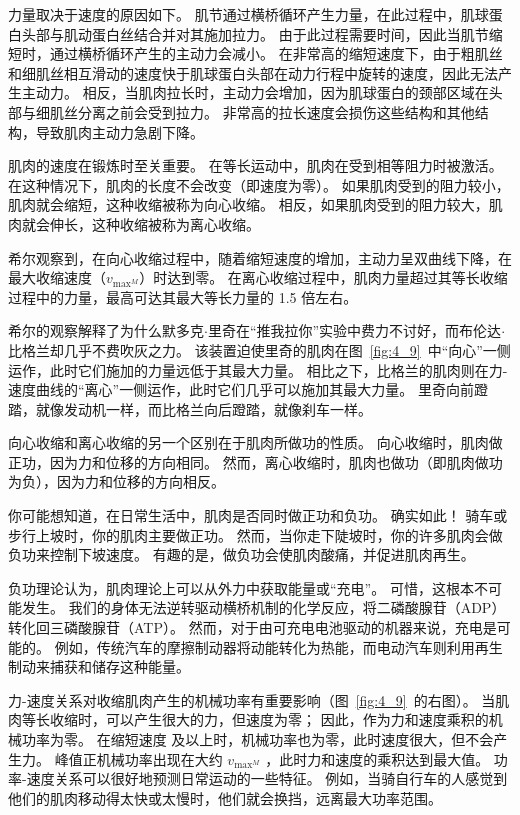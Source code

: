 力量取决于速度的原因如下。
肌节通过横桥循环产生力量，在此过程中，肌球蛋白头部与肌动蛋白丝结合并对其施加拉力。
由于此过程需要时间，因此当肌节缩短时，通过横桥循环产生的主动力会减小。
在非常高的缩短速度下，由于粗肌丝和细肌丝相互滑动的速度快于肌球蛋白头部在动力行程中旋转的速度，因此无法产生主动力。
相反，当肌肉拉长时，主动力会增加，因为肌球蛋白的颈部区域在头部与细肌丝分离之前会受到拉力。
非常高的拉长速度会损伤这些结构和其他结构，导致肌肉主动力急剧下降。


肌肉的速度在锻炼时至关重要。
在等长运动中，肌肉在受到相等阻力时被激活。
在这种情况下，肌肉的长度不会改变（即速度为零）。
如果肌肉受到的阻力较小，肌肉就会缩短，这种收缩被称为向心收缩。
相反，如果肌肉受到的阻力较大，肌肉就会伸长，这种收缩被称为离心收缩。


希尔观察到，在向心收缩过程中，随着缩短速度的增加，主动力呈双曲线下降，在最大收缩速度（$v_{\text{max}^M}$）时达到零。
在离心收缩过程中，肌肉力量超过其等长收缩过程中的力量，最高可达其最大等长力量的 1.5 倍左右。


希尔的观察解释了为什么默多克$\cdot$里奇在“推我拉你”实验中费力不讨好，而布伦达$\cdot$比格兰却几乎不费吹灰之力。
该装置迫使里奇的肌肉在图~\ref{fig:4_9}~中“向心”一侧运作，此时它们施加的力量远低于其最大力量。
相比之下，比格兰的肌肉则在力-速度曲线的“离心”一侧运作，此时它们几乎可以施加其最大力量。
里奇向前蹬踏，就像发动机一样，而比格兰向后蹬踏，就像刹车一样。


向心收缩和离心收缩的另一个区别在于肌肉所做功的性质。
向心收缩时，肌肉做正功，因为力和位移的方向相同。
然而，离​​心收缩时，肌肉也做功（即肌肉做功为负），因为力和位移的方向相反。


你可能想知道，在日常生活中，肌肉是否同时做正功和负功。
确实如此！
骑车或步行上坡时，你的肌肉主要做正功。
然而，当你走下陡坡时，你的许多肌肉会做负功来控制下坡速度。
有趣的是，做负功会使肌肉酸痛，并促进肌肉再生。


负功理论认为，肌肉理论上可以从外力中获取能量或“充电”。
可惜，这根本不可能发生。
我们的身体无法逆转驱动横桥机制的化学反应，将二磷酸腺苷（ADP）转化回三磷酸腺苷（ATP）。
然而，对于由可充电电池驱动的机器来说，充电是可能的。
例如，传统汽车的摩擦制动器将动能转化为热能，而电动汽车则利用再生制动来捕获和储存这种能量。


力-速度关系对收缩肌肉产生的机械功率有重要影响（图~\ref{fig:4_9}~的右图）。
当肌肉等长收缩时，可以产生很大的力，但速度为零；
因此，作为力和速度乘积的机械功率为零。
在缩短速度 及以上时，机械功率也为零，此时速度很大，但不会产生力。
峰值正机械功率出现在大约 $v_{\text{max}^M}$ ，此时力和速度的乘积达到最大值。
功率-速度关系可以很好地预测日常运动的一些特征。
例如，当骑自行车的人感觉到他们的肌肉移动得太快或太慢时，他们就会换挡，远离最大功率范围。


